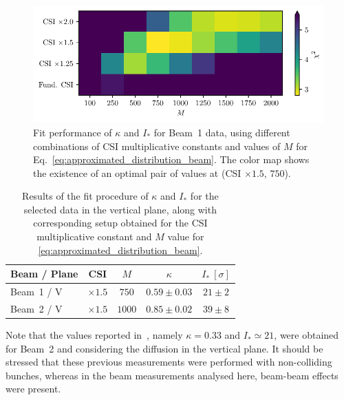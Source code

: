 \begin{figure}[hpt]
    \centering
    \includegraphics[trim={0 2.5mm 0 1.5mm}, clip, width=0.98\columnwidth]{5_Diffusion_measurement_LHC/figs/fourth.pdf}
    \caption{Fit performance of $\kappa$ and $I_\ast$ for Beam~1 data, using different combinations of CSI multiplicative constants and values of $M$ for Eq.~\eqref{eq:approximated_distribution_beam}. The color map shows the existence of an optimal pair of values at (CSI $\times 1.5$, $750$).}
    \label{fig:fourth}
\end{figure}
%
\begin{table}[hpt]
    \centering
    \begin{tabular}{lcccc}
        \toprule
        Beam / Plane & CSI & $M$ & $\kappa$ & $I_\ast\ [\sigma]$ \\
        \midrule
        Beam~1 / V & $\times1.5$ & $750$ & $0.59\pm0.03$ & $21\pm2$ \\
        Beam~2 / V & $\times1.5$ & $1000$ & $0.85\pm0.02$ & $39\pm8$ \\
        \bottomrule
    \end{tabular}
    \caption{Results of the fit procedure of $\kappa$ and $I_\ast$ for the selected data in the vertical plane, along with corresponding setup obtained for the CSI multiplicative constant and $M$ value for \eqref{eq:approximated_distribution_beam}.}
    \label{tab:fit_results}
\end{table}
%

Note that the values reported in~\cite{bazzani2020diffusion}, namely $\kappa=0.33 $ and $I_\ast \simeq 21$, were obtained for Beam~2 and considering the diffusion in the vertical plane. It should be stressed that these previous measurements were performed with non-colliding bunches, whereas in the beam measurements analysed here, beam-beam effects were present.

